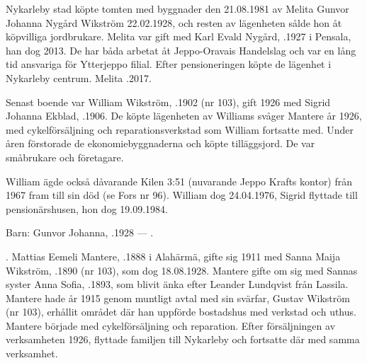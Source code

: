 Nykarleby stad köpte tomten med byggnader den 21.08.1981 av Melita Gunvor Johanna Nygård \textborn Wikström 22.02.1928, och resten av lägenheten sålde hon åt köpvilliga jordbrukare. Melita var gift med Karl Evald Nygård, .1927 i Pensala, han dog 2013. De har båda arbetat åt Jeppo-Oravais Handelslag och var en lång tid ansvariga för Ytterjeppo filial. Efter pensioneringen köpte de lägenhet i Nykarleby centrum. Melita .2017.


Senast boende var William Wikström, .1902 (nr 103), gift 1926 med Sigrid Johanna Ekblad, .1906. De köpte lägenheten av Williams svåger Mantere år 1926, med cykelförsäljning och reparationsverkstad som William fortsatte med. Under åren förstorade de ekonomiebyggnaderna och köpte tilläggsjord. De var småbrukare och företagare.

William ägde också dåvarande Kilen 3:51 (nuvarande Jeppo Krafts kontor) från 1967 fram till sin död (se Fors nr 96). William dog 24.04.1976, Sigrid flyttade till pensionärshusen, hon dog 19.09.1984.

Barn: Gunvor Johanna, .1928 ---  .


                    .
Mattias Eemeli Mantere, .1888 i Alahärmä, gifte sig 1911 med Sanna Maija Wikström, .1890 (nr 103), som dog 18.08.1928. Mantere gifte om sig med Sannas syster Anna Sofia, .1893, som blivit änka efter Leander Lundqvist från Lassila. Mantere hade år 1915 genom  muntligt avtal med sin svärfar, Gustav Wikström (nr 103), erhållit området där han uppförde bostadshus med verkstad och uthus. Mantere började med cykelförsäljning och reparation. Efter försäljningen av verksamheten 1926, flyttade familjen till Nykarleby och fortsatte där med samma verksamhet.
\begin{jhchildren}
  \item {}
  \item {}
  \item {}
  \item {}
  \item {}
  \item {}
  \item {}
  \item {}
\end{jhchildren}

